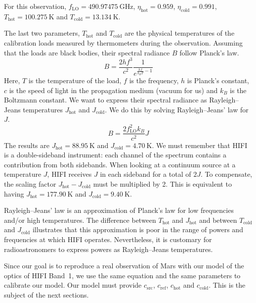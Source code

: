 For this observation,
$f_\text{LO} = \SI{490.97475}{\giga\hertz}$,
$\eta_\text{hot} = 0.959$,
$\eta_\text{cold} = 0.991$,
$T_\text{hot} = \SI{100.275}{\kelvin}$ and
$T_\text{cold} = \SI{13.134}{\kelvin}$.

The last two parameters, $T_\text{hot}$ and $T_\text{cold}$ are the physical temperatures of the calibration loads measured by thermometers during the observation.
Assuming that the loads are black bodies, their spectral radiance $B$ follow Planck's law.
\begin{equation}
    B
    =
    \frac{2 h f^3}{c^2} \frac{1}{e^{\frac{h f}{k_B T} - 1}}
    \label{eq:planck_law}
\end{equation}
Here, $T$ is the temperature of the load, $f$ is the frequency, $h$ is Planck's constant, $c$ is the speed of light in the propagation medium (vacuum for us) and $k_B$ is the Boltzmann constant.
We want to express their spectral radiance as Rayleigh--Jeans temperatures $J_\text{hot}$ and $J_\text{cold}$.
We do this by solving Rayleigh--Jeans' law for $J$.
\begin{equation}
    B
    =
    \frac{2 f_\text{LO}^2 k_B}{c^2}J
    \label{eq:rayleigh_jeans_law}
\end{equation}
The results are $J_\text{hot} = \SI{88.95}{\kelvin}$ and $J_\text{cold} = \SI{4.70}{\kelvin}$.
We must remember that HIFI is a double-sideband instrument: each channel of the spectrum contains a contribution from both sidebands.
When looking at a continuum source at a temperature $J$, HIFI receives $J$ in each sideband for a total of $2J$.
To compensate, the scaling factor $J_\text{hot} - J_\text{cold}$ must be multiplied by 2.
This is equivalent to having $J_\text{hot} = \SI{177.90}{\kelvin}$ and $J_\text{cold}=\SI{9.40}{\kelvin}$.


Rayleigh--Jeans' law is an approximation of Planck's law for low frequencies and/or high temperatures.
The difference between $T_\text{hot}$ and $J_\text{hot}$ and between $T_\text{cold}$ and $J_\text{cold}$ illustrates that this approximation is poor in the range of powers and frequencies at which HIFI operates.
Nevertheless, it is customary for radioastronomers to express powers as Rayleigh--Jeans temperatures.

Since our goal is to reproduce a real observation of Mars with our model of the optics of HIFI Band~1, we use the same equation and the same parameters to calibrate our model.
Our model must provide $c_\text{src}$, $c_\text{ref}$, $c_\text{hot}$ and $c_\text{cold}$.
This is the subject of the next sections.



